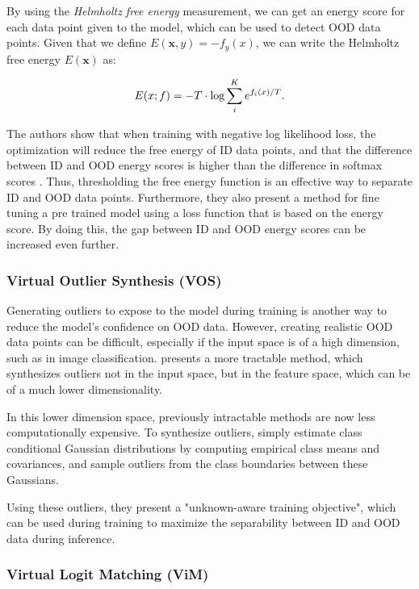 \documentclass[conference]{IEEEtran}
\begin{document}
By using the {\it Helmholtz free energy} measurement, we can get an energy score for each data point given to the model, which can be used to detect OOD data points. Given that we define $E(\bm{x}, y) = -f_y(x)$, we can write the Helmholtz free energy $E(\bm{x})$ as:

\begin{equation}\label{eq:energy_softmax}
  E(\*x;f)=- T\cdot \text{log}\sum_i^K e^{f_i(\*x)/T}.
\end{equation}

The authors show that when training with negative log likelihood loss, the optimization will reduce the free energy of ID data points, and that the difference  between ID and OOD energy scores is higher than the difference in softmax scores \cite{energy}. Thus, thresholding the free energy function is an effective way to separate ID and OOD data points. Furthermore, they also present a method for fine tuning a pre trained model using a loss function that is based on the energy score. By doing this, the gap between ID and OOD energy scores can be increased even further.
\\

\subsubsection{Virtual Outlier Synthesis (VOS)}

Generating outliers to expose to the model during training is another way to reduce the model's confidence on OOD data. However, creating realistic OOD data points can be difficult, especially if the input space is of a high dimension, such as in image classification. \cite{vos} presents a more tractable method, which synthesizes outliers not in the input space, but in the feature space, which can be of a much lower dimensionality.

In this lower dimension space, previously intractable methods are now less computationally expensive. To synthesize outliers, \cite{vos} simply estimate class conditional Gaussian distributions by computing empirical class means and covariances, and sample outliers from the class boundaries between these Gaussians.

Using these outliers, they present a "unknown-aware training objective", which can be used during training to maximize the separability between ID and OOD data during inference.
\\

\subsubsection{Virtual Logit Matching (ViM)}
\end{document}
